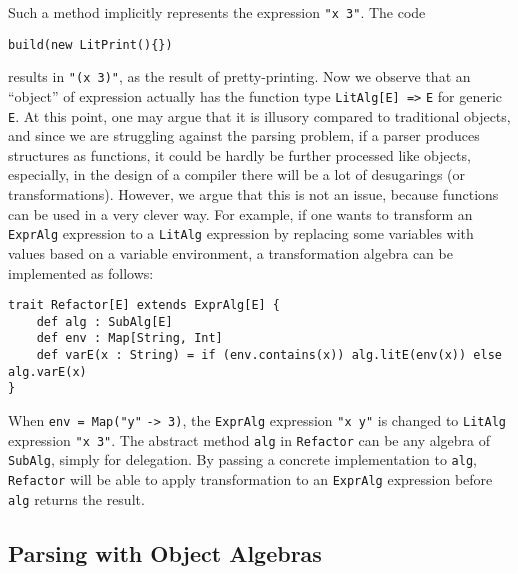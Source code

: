 Such a method implicitly represents the expression \lstinline{"x 3"}. The code
\begin{lstlisting}
build(new LitPrint(){})
\end{lstlisting}
results in \lstinline{"(x 3)"}, as the result of pretty-printing. Now we observe that an ``object'' of expression actually
has the function type \lstinline{LitAlg[E] =>} \lstinline{E} for generic \lstinline{E}. At this point, one may argue
that it is illusory compared to traditional objects, and since we are struggling against the parsing problem, if a parser
produces structures as functions, it could be hardly be further processed like objects, especially, in the design of a compiler
there will be a lot of desugarings (or transformations). However, we argue that this is not an issue, because functions can be used
in a very clever way. For example, if one wants to transform an \lstinline{ExprAlg} expression to a \lstinline{LitAlg} expression by
replacing some variables with values based on a variable environment, a transformation algebra can be implemented as follows:
\begin{lstlisting}
trait Refactor[E] extends ExprAlg[E] {
    def alg : SubAlg[E]
    def env : Map[String, Int]
    def varE(x : String) = if (env.contains(x)) alg.litE(env(x)) else alg.varE(x)
}
\end{lstlisting}
When \lstinline{env = Map("y"} \lstinline{-> 3)}, the \lstinline{ExprAlg} expression \lstinline{"x y"} is changed to \lstinline{LitAlg} expression \lstinline{"x 3"}. The abstract method
\lstinline{alg} in \lstinline{Refactor} can be any algebra of \lstinline{SubAlg}, simply for delegation. By passing a concrete implementation
to \lstinline{alg}, \lstinline{Refactor} will be able to apply transformation to an \lstinline{ExprAlg} expression before \lstinline{alg} returns the result.

\subsection{Parsing with Object Algebras}\label{subsec:parsingwithoa}

